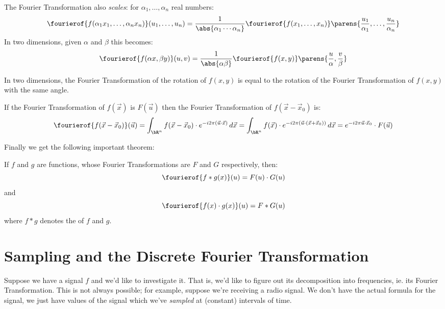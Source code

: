 \documentclass[10pt]{article}
\begin{document}
    \item The Fourier Transformation also \emph{scales}: for $\alpha_1,\dots,\alpha_n$ real numbers:
    \[ \fourierof{f(\alpha_1 x_1,\dots,\alpha_n x_n)}(u_1,\dots,u_n) = \frac1{\abs{\alpha_1\cdots\alpha_n}}\fourierof{f(x_1,\dots,x_n)}\parens{\frac{u_1}{\alpha_1},\dots,\frac{u_n}{\alpha_n}} \]
    In two dimensions, given $\alpha$ and $\beta$ this becomes:
    \[ \fourierof{f(\alpha x,\beta y)}(u,v) = \frac1{\abs{\alpha\beta}}\fourierof{f(x,y)}\parens{\frac u\alpha, \frac v\beta} \]

    \item In two dimensions, the Fourier Transformation of the rotation of $f(x,y)$ is equal to the rotation of the Fourier Transformation of $f(x,y)$ with the same angle.

    \item If the Fourier Transformation of $f(\vec x)$ is $F(\vec u)$ then the Fourier Transformation of $f(\vec x-\vec x_0)$ is:
    \[ \fourierof{f(\vec x-\vec x_0)}(\vec u) = \int_{\bR^n} f(\vec x-\vec x_0)\cdot e^{-i2\pi(\vec u\cdot\vec x)}\,d\vec x = \int_{\bR^n} f(\vec x)\cdot e^{-i2\pi(\vec u\cdot(\vec x+\vec x_0))}\,d\vec x
    = e^{-i2\pi\vec u\cdot\vec x_0}\cdot F(\vec u) \]
\eenum

Finally we get the following important theorem:

\begin{thrm*}

    If $f$ and $g$ are functions, whose Fourier Transformations are $F$ and $G$ respectively, then:
    \[ \fourierof{f\ast g(x)}(u) = F(u)\cdot G(u) \]
    and
    \[ \fourierof{f(x)\cdot g(x)}(u) = F\ast G(u) \]
    where $f\ast g$ denotes the  of $f$ and $g$.

\end{thrm*}

\section{Sampling and the Discrete Fourier Transformation}

Suppose we have a signal $f$ and we'd like to investigate it.
That is, we'd like to figure out its decomposition into frequencies, ie. its Fourier Transformation.
This is not always possible; for example, suppose we're receiving a radio signal.
We don't have the actual formula for the signal, we just have values of the signal which we've \emph{sampled} at (constant) intervals of time.
\end{document}
